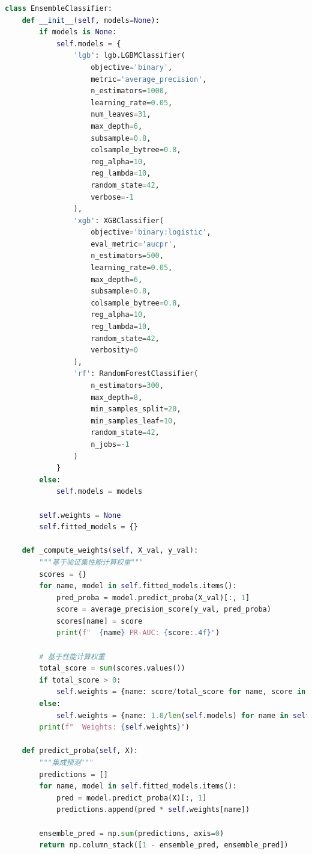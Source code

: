 \documentclass[12pt,a4paper]{article}
\begin{document}
\begin{lstlisting}[language=Python, caption=集成学习器实现]
class EnsembleClassifier:
    def __init__(self, models=None):
        if models is None:
            self.models = {
                'lgb': lgb.LGBMClassifier(
                    objective='binary',
                    metric='average_precision',
                    n_estimators=1000,
                    learning_rate=0.05,
                    num_leaves=31,
                    max_depth=6,
                    subsample=0.8,
                    colsample_bytree=0.8,
                    reg_alpha=10,
                    reg_lambda=10,
                    random_state=42,
                    verbose=-1
                ),
                'xgb': XGBClassifier(
                    objective='binary:logistic',
                    eval_metric='aucpr',
                    n_estimators=500,
                    learning_rate=0.05,
                    max_depth=6,
                    subsample=0.8,
                    colsample_bytree=0.8,
                    reg_alpha=10,
                    reg_lambda=10,
                    random_state=42,
                    verbosity=0
                ),
                'rf': RandomForestClassifier(
                    n_estimators=300,
                    max_depth=8,
                    min_samples_split=20,
                    min_samples_leaf=10,
                    random_state=42,
                    n_jobs=-1
                )
            }
        else:
            self.models = models
        
        self.weights = None
        self.fitted_models = {}
    
    def _compute_weights(self, X_val, y_val):
        """基于验证集性能计算权重"""
        scores = {}
        for name, model in self.fitted_models.items():
            pred_proba = model.predict_proba(X_val)[:, 1]
            score = average_precision_score(y_val, pred_proba)
            scores[name] = score
            print(f"  {name} PR-AUC: {score:.4f}")
        
        # 基于性能计算权重
        total_score = sum(scores.values())
        if total_score > 0:
            self.weights = {name: score/total_score for name, score in scores.items()}
        else:
            self.weights = {name: 1.0/len(self.models) for name in self.models.keys()}
        print(f"  Weights: {self.weights}")
    
    def predict_proba(self, X):
        """集成预测"""
        predictions = []
        for name, model in self.fitted_models.items():
            pred = model.predict_proba(X)[:, 1]
            predictions.append(pred * self.weights[name])
        
        ensemble_pred = np.sum(predictions, axis=0)
        return np.column_stack([1 - ensemble_pred, ensemble_pred])
\end{lstlisting}
\end{document}

